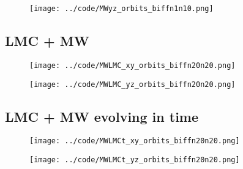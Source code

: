 \begin{figure}[H]
\centering
\texttt{[image: ../code/MWyz\_orbits\_biffn1n10.png]}
\end{figure} 


\subsection{LMC + MW}


\begin{figure}[H]
\centering
\texttt{[image: ../code/MWLMC\_xy\_orbits\_biffn20n20.png]}
\end{figure}


\begin{figure}[H]
\centering
\texttt{[image: ../code/MWLMC\_yz\_orbits\_biffn20n20.png]}
\end{figure}

 
\subsection{LMC + MW evolving in time}

\begin{figure}[H]
\centering
\texttt{[image: ../code/MWLMCt\_xy\_orbits\_biffn20n20.png]}
\end{figure}


\begin{figure}[H]
\centering
\texttt{[image: ../code/MWLMCt\_yz\_orbits\_biffn20n20.png]}
\end{figure}


